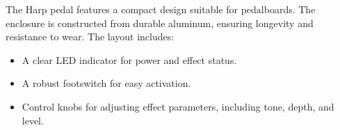 The Harp pedal features a compact design suitable for pedalboards. The enclosure is constructed from durable aluminum, ensuring longevity and resistance to wear. The layout includes:
\begin{itemize}
\item A clear LED indicator for power and effect status.
\item A robust footswitch for easy activation.
\item Control knobs for adjusting effect parameters, including tone, depth, and level.
\end{itemize}
